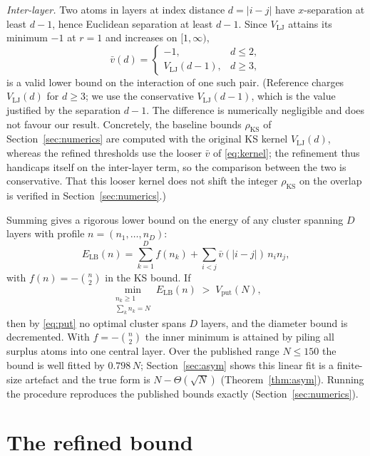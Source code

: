 \documentclass[11pt]{article}
\theoremstyle{remark}
\newcommand{\LB}{\mathrm{LB}}
\newcommand{\KS}{\mathrm{KS}}
\newcommand{\vput}{\mathrm{put}}
\begin{document}
\emph{Inter-layer.} Two atoms in layers at index distance $d=|i-j|$ have $x$-separation at least $d-1$, hence Euclidean separation at least $d-1$. Since $V_{\mathrm{LJ}}$ attains its minimum $-1$ at $r=1$ and increases on $[1,\infty)$,
\begin{equation}\label{eq:kernel}
\bar v(d) =
\begin{cases}
-1, & d\le 2,\\
V_{\mathrm{LJ}}(d-1), & d\ge 3,
\end{cases}
\end{equation}
is a valid lower bound on the interaction of one such pair. (Reference \cite{ks2025} charges $V_{\mathrm{LJ}}(d)$ for $d\ge3$; we use the conservative $V_{\mathrm{LJ}}(d-1)$, which is the value justified by the separation $d-1$. The difference is numerically negligible and does not favour our result. Concretely, the baseline bounds $\rho_\KS$ of Section~\ref{sec:numerics} are computed with the original KS kernel $V_{\mathrm{LJ}}(d)$, whereas the refined thresholds use the looser $\bar v$ of \eqref{eq:kernel}; the refinement thus handicaps itself on the inter-layer term, so the comparison between the two is conservative. That this looser kernel does not shift the integer $\rho_\KS$ on the overlap is verified in Section~\ref{sec:numerics}.)

Summing gives a rigorous lower bound on the energy of any cluster spanning $D$ layers with profile $n=(n_1,\dots,n_D)$:
\begin{equation}\label{eq:elb}
E_\LB(n) = \sum_{k=1}^D f(n_k) + \sum_{i<j} \bar v(|i-j|)\, n_i n_j,
\end{equation}
with $f(n)=-\binom n2$ in the KS bound. If
\begin{equation}\label{eq:rule}
\min_{\substack{n_k\ge1\\ \sum_k n_k=N}} E_\LB(n) \;>\; V_\vput(N),
\end{equation}
then by \eqref{eq:put} no optimal cluster spans $D$ layers, and the diameter bound is decremented. With $f=-\binom n2$ the inner minimum is attained by piling all surplus atoms into one central layer. Over the published range $N\le150$ the bound is well fitted by $0.798\,N$; Section~\ref{sec:asym} shows this linear fit is a finite-size artefact and the true form is $N-\Theta(\sqrt N)$ (Theorem~\ref{thm:asym}). Running the procedure reproduces the published bounds exactly (Section~\ref{sec:numerics}).

\section{The refined bound}\label{sec:refined}
\end{document}
